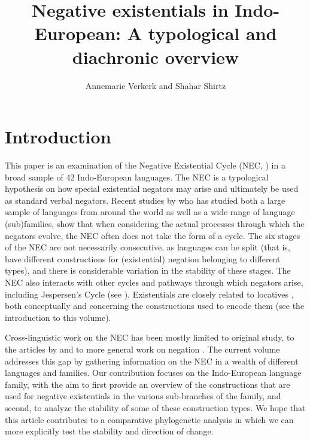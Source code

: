 \documentclass[output=paper,colorlinks,citecolor=brown]{langscibook}
\title{Negative existentials in Indo-European: {A} typological and diachronic overview}
\author{Annemarie Verkerk\affiliation{Max Planck Institute for the Science of Human History;Universität des Saarlandes} and Shahar Shirtz\affiliation{University of Oregon}%
}
\begin{document}
\maketitle

\section{Introduction}\label{sec:ieur-1}
\largerpage
This paper is an examination of the Negative Existential Cycle (NEC,
\citealt{Croft1991}) in a broad sample of 42
Indo-European languages. The
NEC is a typological hypothesis on how special existential negators may
arise and ultimately be used as standard verbal negators. Recent studies by
\textcites{Veselinova2013}{Veselinova2014}{Veselinova2015}{Veselinova2016} who has studied both a large sample of
languages from around the world as well as a wide range of language
(sub)families, show that when considering the actual processes through
which the negators evolve, the NEC often does not take the form of a cycle.
The six stages of the NEC are not necessarily consecutive, as languages can
be split (that is, have different constructions for (existential) negation
belonging to different types), and there is considerable variation in the
stability of these stages. The NEC also interacts with other cycles and
pathways through which negators arise, including Jespersen's Cycle
(see ). Existentials are closely related to
locatives \parencites{Clark1978}{Creissels2013ieur}, both conceptually and
concerning the constructions used to encode them (see the introduction to
this volume). 

Cross-linguistic work on the NEC has been mostly limited to
 original study, to the articles by
\textcites{Veselinova2013}{Veselinova2014}{Veselinova2015}{Veselinova2016}
    and to more general work on negation 
\parencites{KahrelBerg1994}{CyfferEbermann2009}{Budd2010}{WillisLucas2013-ieur}.
The current volume addresses this gap by gathering information on the NEC
in a wealth of different languages and
families. Our contribution focuses on the Indo-European language family,
with the aim to first provide an overview of the constructions that are
used for negative existentials in the various sub-branches of the family,
and second, to analyze the stability of some of these construction types.
We hope that this article contributes to a comparative phylogenetic
analysis in which we can more explicitly test the stability and direction
of change. 
\end{document}
